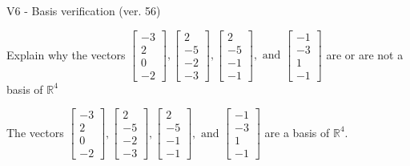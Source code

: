 \begin{exercise}
  \begin{exerciseTitle}V6 - Basis verification (ver. 56)\end{exerciseTitle}
  \begin{exerciseStatement}
    Explain why the vectors \(\left[\begin{array}{r}
-3 \\
2 \\
0 \\
-2
\end{array}\right] , \left[\begin{array}{r}
2 \\
-5 \\
-2 \\
-3
\end{array}\right] , \left[\begin{array}{r}
2 \\
-5 \\
-1 \\
-1
\end{array}\right] , \text{ and } \left[\begin{array}{r}
-1 \\
-3 \\
1 \\
-1
\end{array}\right]\) are or are not a basis of \(\mathbb{R}^4\)	


  \end{exerciseStatement}
  \begin{exerciseAnswer}
   The vectors \(\left[\begin{array}{r}
-3 \\
2 \\
0 \\
-2
\end{array}\right] , \left[\begin{array}{r}
2 \\
-5 \\
-2 \\
-3
\end{array}\right] , \left[\begin{array}{r}
2 \\
-5 \\
-1 \\
-1
\end{array}\right] , \text{ and } \left[\begin{array}{r}
-1 \\
-3 \\
1 \\
-1
\end{array}\right]\) 
  	 are  a basis of \(\mathbb{R}^4\).
  


  \end{exerciseAnswer}
\end{exercise}